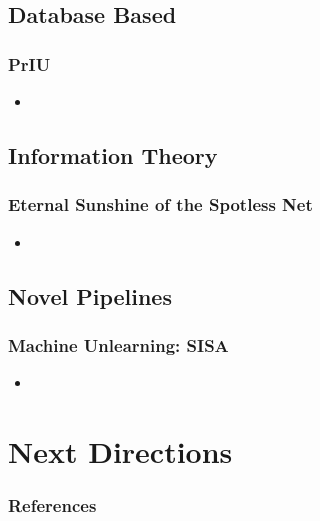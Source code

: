 \documentclass[pdf]{beamer}
\begin{document}
\subsection{Database Based}
\begin{frame}
  \myNset[3]
  \smartart
\end{frame}


\begin{frame}
  \frametitle{
    PrIU \cite{wuPrIUProvenanceBasedApproach2020}
    }
  \begin{itemize}
    \item 
  \end{itemize}
\end{frame}

\subsection{Information Theory}
\begin{frame}
  \myNset[4]
  \smartart
\end{frame}

\begin{frame}
  \frametitle{
    Eternal Sunshine of the Spotless Net \cite{golatkarEternalSunshineSpotless2020}
    }
  \begin{itemize}
    \item 
  \end{itemize}
\end{frame}

\subsection{Novel Pipelines}
\begin{frame}
  \myNset[5]
  \smartart
\end{frame}


\begin{frame}
  \frametitle{
    Machine Unlearning: SISA \cite{bourtouleMachineUnlearning2020}
    }
  \begin{itemize}
    \item 
  \end{itemize}
\end{frame}

\section{Next Directions}



\begin{frame}[allowframebreaks]
  \frametitle{References}
  
  
\end{frame}
\end{document}
